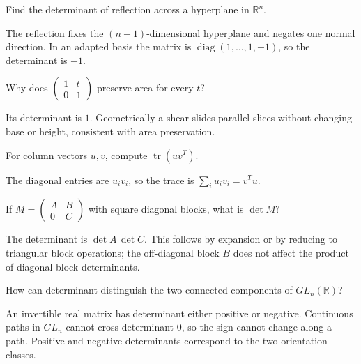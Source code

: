 \begin{problem}\label{prob:i08-problem-07}
Find the determinant of reflection across a hyperplane in $\mathbb R^n$.
\end{problem}
\begin{solution}
The reflection fixes the $(n-1)$-dimensional hyperplane and negates one normal direction. In an adapted basis the matrix is $\operatorname{diag}(1,\dots,1,-1)$, so the determinant is $-1$.
\end{solution}

\begin{problem}\label{prob:i08-problem-08}
Why does $\begin{pmatrix}1&t\\0&1\end{pmatrix}$ preserve area for every $t$?
\end{problem}
\begin{solution}
Its determinant is $1$. Geometrically a shear slides parallel slices without changing base or height, consistent with area preservation.
\end{solution}

\begin{problem}\label{prob:i08-problem-09}
For column vectors $u,v$, compute $\operatorname{tr}(uv^T)$.
\end{problem}
\begin{solution}
The diagonal entries are $u_iv_i$, so the trace is $\sum_i u_iv_i=v^Tu$.
\end{solution}

\begin{problem}\label{prob:i08-problem-10}
If $M=\begin{pmatrix}A&B\\0&C\end{pmatrix}$ with square diagonal blocks, what is $\det M$?
\end{problem}
\begin{solution}
The determinant is $\det A\,\det C$. This follows by expansion or by reducing to triangular block operations; the off-diagonal block $B$ does not affect the product of diagonal block determinants.
\end{solution}

\begin{problem}\label{prob:i08-problem-11}
How can determinant distinguish the two connected components of $GL_n(\mathbb R)$?
\end{problem}
\begin{solution}
An invertible real matrix has determinant either positive or negative. Continuous paths in $GL_n$ cannot cross determinant $0$, so the sign cannot change along a path. Positive and negative determinants correspond to the two orientation classes.
\end{solution}

